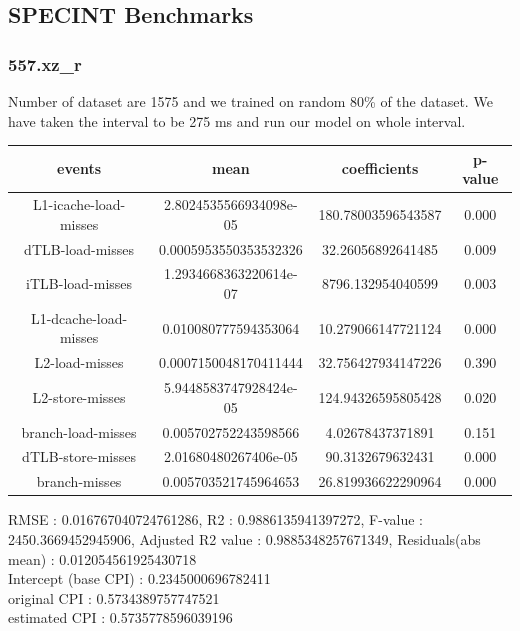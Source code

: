 \documentclass[10pt, letterpaper, IEEEtran, tikz,border=5,a4paper,fleqn]{article}
\begin{document}
\subsection{SPECINT Benchmarks}

\subsubsection{557.xz\_r}

Number of dataset are 1575 and we trained on random 80\% of the dataset. We have taken the interval to be 275 ms and run our model on whole interval.
\begin{center}
\begin{tabular}{||c c c c||}
 \hline
 \textbf{events} & \textbf{mean} & \textbf{coefficients} & \textbf{p-value}\\ [0.5ex]
 \hline\hline
 L1-icache-load-misses & 2.8024535566934098e-05 & 180.78003596543587 & 0.000\\
 \hline
 dTLB-load-misses & 0.0005953550353532326 & 32.26056892641485 & 0.009\\
 \hline
 iTLB-load-misses & 1.2934668363220614e-07 & 8796.132954040599 & 0.003\\
 \hline
 L1-dcache-load-misses & 0.010080777594353064 & 10.279066147721124 & 0.000\\
 \hline
 L2-load-misses & 0.0007150048170411444 & 32.756427934147226 & 0.390\\
 \hline
 L2-store-misses & 5.9448583747928424e-05 & 124.94326595805428 & 0.020\\
 \hline
 branch-load-misses & 0.005702752243598566 & 4.02678437371891 & 0.151\\
 \hline
 dTLB-store-misses & 2.01680480267406e-05 & 90.3132679632431 & 0.000\\
 \hline
 branch-misses & 0.005703521745964653 & 26.819936622290964 & 0.000\\
 \hline
\end{tabular}
\end{center}
RMSE : 0.016767040724761286,
R2 : 0.9886135941397272,
F-value : 2450.3669452945906,
Adjusted R2 value : 0.9885348257671349,
Residuals(abs mean) : 0.012054561925430718\\

\noindent Intercept (base CPI) : 0.2345000696782411\\
original CPI : 0.5734389757747521\\
estimated CPI : 0.5735778596039196\\
\end{document}
